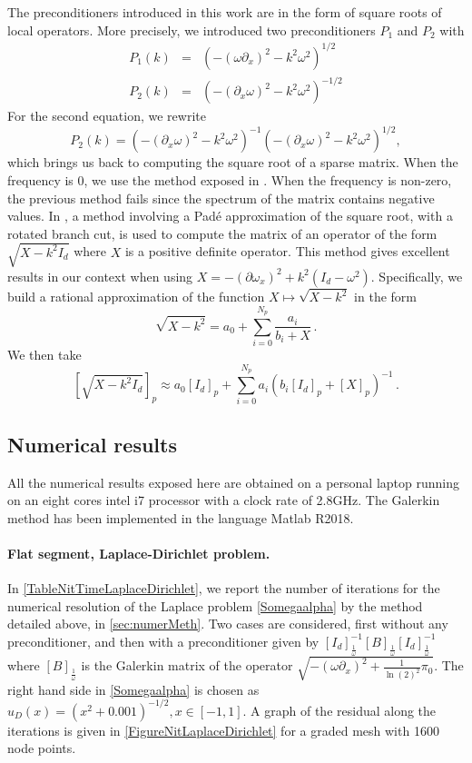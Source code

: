 \documentclass[a4paper]{article}
\begin{document}
The preconditioners introduced in this work are in the form of square roots of local operators. More precisely, we introduced two preconditioners $P_1$ and $P_2$ with 
\begin{eqnarray*}
	P_1(k) &=& \left(-(\omega \partial_x)^2 - k^2 \omega^2\right)^{1/2}\\
	P_2(k) &=& \left(-(\partial_x \omega)^2 - k^2 \omega^2 \right)^{-1/2}
\end{eqnarray*}
For the second equation, we rewrite 
\[P_2(k) = \left(-(\partial_x \omega)^2 - k^2 \omega^2 \right)^{-1} \left(-(\partial_x \omega)^2 - k^2 \omega^2 \right)^{1/2},\]
which brings us back to computing the square root of a sparse matrix. When the frequency is $0$, we use the method exposed in \cite{hale2008computing}. 
When the frequency is non-zero, the previous method fails since the spectrum of the matrix contains negative values. In \cite{antoine2007generalized}, a 
method involving a Pad\'e approximation of the square root, with a rotated branch cut, is used to compute the matrix of an operator of the form 
$\sqrt{X - k^2 I_d}$ where $X$ is a positive definite operator. This method gives excellent results in our context when using 
$X = -(\partial \omega_x)^2 + k^2 \left(I_d - \omega^2\right)$. Specifically, we build a rational approximation of the function $X \mapsto \sqrt{X - k^2}$ in the form
\[\sqrt{X - k^2} = a_0 + \sum_{i = 0}^{N_p} \frac{a_i}{b_i + X}\,.\]
We then take
\[\left[\sqrt{X - k^2 I_d}\right]_p \approx a_0[I_d]_p + \sum_{i = 0}^{N_p} a_i\left(b_i[I_d]_p + [X]_p\right)^{-1}\,.\]

\subsection{Numerical results}
\label{sec:NumericalResutls}

All the numerical results exposed here are obtained on a personal laptop running on an eight cores intel i7 processor with a clock rate of 2.8GHz. 
The Galerkin method has been implemented in the language Matlab R2018. 


\paragraph{Flat segment, Laplace-Dirichlet problem.} 
In \autoref{TableNitTimeLaplaceDirichlet}, we report the number of iterations for the numerical resolution of the Laplace problem \eqref{Somegaalpha} 
by the method detailed above, in \autoref{sec:numerMeth}. Two cases are considered, first without any preconditioner, and then with a preconditioner given 
by $[I_d]_\frac{1}{\omega}^{-1} \left[B \right]_\frac{1}{\omega} [I_d]_\frac{1}{\omega}^{-1}$ where
$[B]_\frac{1}{\omega}$ is the Galerkin matrix of the operator $\sqrt{ -(\omega \partial_x)^2 + \frac{1}{\ln(2)^2} \pi_0}$. The right hand 
side in \eqref{Somegaalpha} is chosen as $u_D(x) = (x^2 + 0.001)^{-1/2}, x \in [-1,1]$. A graph of the residual along the iterations is given in \autoref{FigureNitLaplaceDirichlet} for a graded mesh with 1600 node points. 
\end{document}

